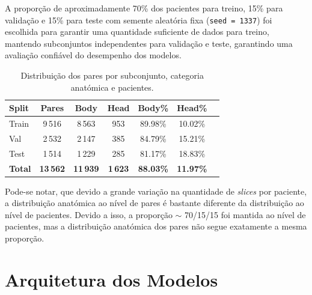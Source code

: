 A proporção de aproximadamente 70\% dos pacientes para treino, 15\% para validação e 15\% para teste com semente aleatória fixa (\texttt{seed = 1337}) foi escolhida para garantir uma quantidade suficiente de dados para treino, mantendo subconjuntos independentes para validação e teste, garantindo uma avaliação confiável do desempenho dos modelos.

\begin{table}[H]
    \centering
    \caption{Distribuição dos pares por subconjunto, categoria anatómica e pacientes.}
    \label{tab:split_pares}
    \begin{tabular}{lcccccc}
        \hline
        \textbf{Split} & \textbf{Pares} & \textbf{Body} & \textbf{Head}  & \textbf{Body\%} & \textbf{Head\%}\\
        \hline
        Train & 9\,516 & 8\,563 & 953 & 89.98\% & 10.02\% \\
        Val   & 2\,532 & 2\,147 & 385 & 84.79\% & 15.21\% \\
        Test  & 1\,514 & 1\,229 & 285 & 81.17\% & 18.83\% \\
        \hline
        \textbf{Total} & \textbf{13\,562} & \textbf{11\,939} & \textbf{1\,623} & \textbf{88.03\%} & \textbf{11.97\%} \\
        \hline
    \end{tabular}
\end{table}

Pode-se notar, que devido a grande variação na quantidade de \textit{slices} por paciente, a distribuição anatómica ao nível de pares é bastante diferente da distribuição ao nível de pacientes. Devido a isso, a proporção $\sim$ 70/15/15 foi mantida ao nível de pacientes, mas a distribuição anatómica dos pares não segue exatamente a mesma proporção.

\section{Arquitetura dos Modelos}

